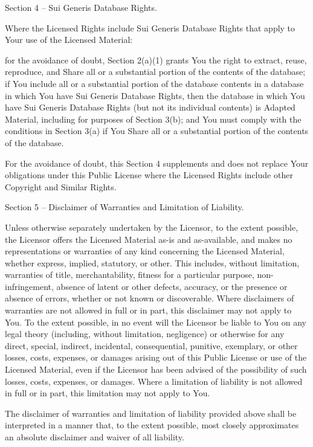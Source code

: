 Section 4 – Sui Generis Database Rights.

Where the Licensed Rights include Sui Generis Database Rights that apply to Your use of the Licensed Material:

    for the avoidance of doubt, Section 2(a)(1) grants You the right to extract, reuse, reproduce, and Share all or a substantial portion of the contents of the database;
    if You include all or a substantial portion of the database contents in a database in which You have Sui Generis Database Rights, then the database in which You have Sui Generis Database Rights (but not its individual contents) is Adapted Material, including for purposes of Section 3(b); and
    You must comply with the conditions in Section 3(a) if You Share all or a substantial portion of the contents of the database.

For the avoidance of doubt, this Section 4 supplements and does not replace Your obligations under this Public License where the Licensed Rights include other Copyright and Similar Rights.

Section 5 – Disclaimer of Warranties and Limitation of Liability.

    Unless otherwise separately undertaken by the Licensor, to the extent possible, the Licensor offers the Licensed Material as-is and as-available, and makes no representations or warranties of any kind concerning the Licensed Material, whether express, implied, statutory, or other. This includes, without limitation, warranties of title, merchantability, fitness for a particular purpose, non-infringement, absence of latent or other defects, accuracy, or the presence or absence of errors, whether or not known or discoverable. Where disclaimers of warranties are not allowed in full or in part, this disclaimer may not apply to You.
    To the extent possible, in no event will the Licensor be liable to You on any legal theory (including, without limitation, negligence) or otherwise for any direct, special, indirect, incidental, consequential, punitive, exemplary, or other losses, costs, expenses, or damages arising out of this Public License or use of the Licensed Material, even if the Licensor has been advised of the possibility of such losses, costs, expenses, or damages. Where a limitation of liability is not allowed in full or in part, this limitation may not apply to You.

    The disclaimer of warranties and limitation of liability provided above shall be interpreted in a manner that, to the extent possible, most closely approximates an absolute disclaimer and waiver of all liability.

